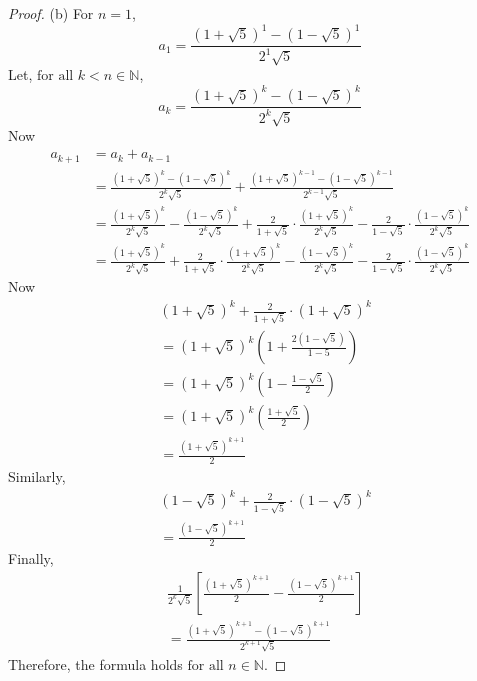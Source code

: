 \documentclass[12pt]{article}
\begin{document}
\begin{proof}
	(b) For $n = 1$,
	\[
		a_1 = \frac{(1+\sqrt{5})^1 - (1-\sqrt{5})^1}{2^1\sqrt{5}}
	\]
	Let, $\text{for all } k < n \in \mathbb{N}$,
	\[
		a_k = \frac{(1+\sqrt{5})^k - (1-\sqrt{5})^k}{2^k \sqrt{5}}
	\]
	Now
	\begin{align*}
		a_{k+1} & = a_k + a_{k-1}                                                                                                                                                                                                 \\
		        & = \frac{(1+\sqrt{5})^k - (1-\sqrt{5})^k}{2^k \sqrt{5}} + \frac{(1+\sqrt{5})^{k-1} - (1-\sqrt{5})^{k-1}}{2^{k-1} \sqrt{5}}                                                                                       \\
		        & = \frac{(1+\sqrt{5})^k}{2^k \sqrt{5}} - \frac{(1-\sqrt{5})^k}{2^k \sqrt{5}} + \frac{2}{1 + \sqrt{5}}\cdot \frac{(1+\sqrt{5})^k}{2^k \sqrt{5}} - \frac{2}{1 - \sqrt{5}}\cdot \frac{(1-\sqrt{5})^k}{2^k \sqrt{5}} \\
		        & = \frac{(1+\sqrt{5})^k}{2^k \sqrt{5}} + \frac{2}{1+\sqrt{5}} \cdot \frac{(1+\sqrt{5})^k}{2^k \sqrt{5}} - \frac{(1-\sqrt{5})^k}{2^k \sqrt{5}} - \frac{2}{1 - \sqrt{5}}\cdot \frac{(1- \sqrt{5})^k}{2^k\sqrt{5}}
	\end{align*}
	Now
	\begin{align*}
		 & (1 + \sqrt{5})^k + \frac{2}{1 + \sqrt{5}}\cdot (1 + \sqrt{5})^k   \\
		 & = (1 + \sqrt{5})^k \left( 1 + \frac{2(1-\sqrt{5})}{1 - 5} \right) \\
		 & = (1 + \sqrt{5})^k (1 - \frac{1 - \sqrt{5}}{2})                   \\
		 & = (1 + \sqrt{5})^k (\frac{1 + \sqrt{5}}{2})                       \\
		 & = \frac{(1 + \sqrt{5})^{k + 1}}{2}
	\end{align*}
	Similarly,
	\begin{align*}
		 & (1 - \sqrt{5})^k + \frac{2}{1 - \sqrt{5}}\cdot (1 - \sqrt{5})^k \\
		 & = \frac{(1 - \sqrt{5})^{k+1}}{2}
	\end{align*}
	Finally,
	\begin{align*}
		 & \frac{1}{2^k \sqrt{5}}[\frac{(1 + \sqrt{5})^{k+1}}{2} - \frac{(1 - \sqrt{5})^{k+1}}{2}] \\
		 & = \frac{(1 + \sqrt{5})^{k+1} - (1 - \sqrt{5})^{k+1}}{2^{k+1} \sqrt{5}}
	\end{align*}
	Therefore, the formula holds $\text{for all } n \in \mathbb{N}$.

\end{proof}
\end{document}
